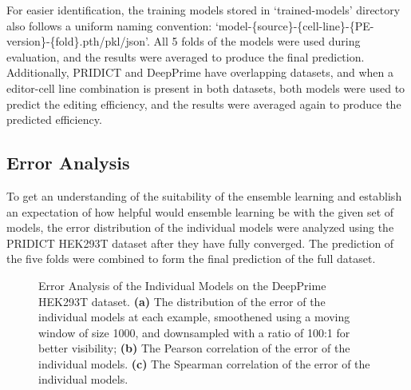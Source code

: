For easier identification, the training models stored in `trained-models' directory also follows a uniform naming convention: `model-\{source\}-\{cell-line\}-\{PE-version\}-\{fold\}.pth/pkl/json'. All 5 folds of the models were used during evaluation, and the results were averaged to produce the final prediction. Additionally, PRIDICT and DeepPrime have overlapping datasets, and when a editor-cell line combination is present in both datasets, both models were used to predict the editing efficiency, and the results were averaged again to produce the predicted efficiency.


\subsection{Error Analysis}

To get an understanding of the suitability of the ensemble learning and establish an expectation of how helpful would ensemble learning be with the given set of models, the error distribution of the individual models were analyzed using the PRIDICT HEK293T dataset after they have fully converged. The prediction of the five folds were combined to form the final prediction of the full dataset.

\begin{figure}
    \centering
    \caption[Error Analysis of the Individual Models]{Error Analysis of the Individual Models on the DeepPrime HEK293T dataset. \textbf{(a)} The distribution of the error of the individual models at each example, smoothened using a moving window of size 1000, and downsampled with a ratio of 100:1 for better visibility; \textbf{(b)} The Pearson correlation of the error of the individual models. \textbf{(c)} The Spearman correlation of the error of the individual models.}
    \label{fig:error-analysis}
\end{figure}

